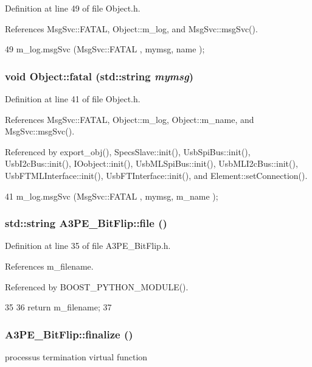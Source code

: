 Definition at line 49 of file Object.h.

References MsgSvc::FATAL, Object::m\_\-log, and MsgSvc::msgSvc().


\begin{DoxyCode}
49 { m_log.msgSvc (MsgSvc::FATAL   , mymsg, name ); }
\end{DoxyCode}
\hypertarget{classObject_aad5a16aac7516ce65bd5ec02ab07fc80}{
\subsubsection[{fatal}]{\setlength{\rightskip}{0pt plus 5cm}void Object::fatal (std::string {\em mymsg})}}
\label{classObject_aad5a16aac7516ce65bd5ec02ab07fc80}


Definition at line 41 of file Object.h.

References MsgSvc::FATAL, Object::m\_\-log, Object::m\_\-name, and MsgSvc::msgSvc().

Referenced by export\_\-obj(), SpecsSlave::init(), UsbSpiBus::init(), UsbI2cBus::init(), IOobject::init(), UsbMLSpiBus::init(), UsbMLI2cBus::init(), UsbFTMLInterface::init(), UsbFTInterface::init(), and Element::setConnection().


\begin{DoxyCode}
41 { m_log.msgSvc (MsgSvc::FATAL   , mymsg, m_name ); }
\end{DoxyCode}
\hypertarget{classA3PE__BitFlip_ace874c555080ce6cb68b6bf320977a5a}{
\subsubsection[{file}]{\setlength{\rightskip}{0pt plus 5cm}std::string A3PE\_\-BitFlip::file ()}}
\label{classA3PE__BitFlip_ace874c555080ce6cb68b6bf320977a5a}


Definition at line 35 of file A3PE\_\-BitFlip.h.

References m\_\-filename.

Referenced by BOOST\_\-PYTHON\_\-MODULE().


\begin{DoxyCode}
35                   {
36     return m_filename;
37   }
\end{DoxyCode}
\hypertarget{classA3PE__BitFlip_ab40772a001613a0e1932d1e356ccf717}{
\subsubsection[{finalize}]{ A3PE\_\-BitFlip::finalize ()}}
\label{classA3PE__BitFlip_ab40772a001613a0e1932d1e356ccf717}
processus termination virtual function 

